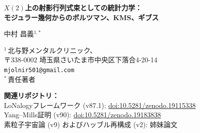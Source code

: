 \documentclass[12pt]{article}
\theoremstyle{plain}
\theoremstyle{definition}
\numberwithin{equation}{section}
\newcommand{\HH}{\mathbb{H}}
\DeclareMathOperator{\Tr}{Tr}
\begin{document}
\begin{titlepage}
\centering
\vspace*{1cm}

{\LARGE\bfseries $X(2)$上の射影行列式束としての統計力学：\\[6pt]
モジュラー幾何からのボルツマン、KMS、ギブス}

\vspace{1.5cm}

{\large 中村 昌義$^{1,*}$}

\vspace{0.8cm}

{\normalsize
$^1$\,北与野メンタルクリニック、\\
〒338-0002 埼玉県さいたま市中央区下落合4-20-14\\
\texttt{mjolnir501@gmail.com}\\[4pt]
$^*$\,責任著者
}

\vspace{0.8cm}

{\small
\noindent\textbf{関連リポジトリ：}\\
LoNalogyフレームワーク (v87.1): \href{https://doi.org/10.5281/zenodo.19115338}{doi:10.5281/zenodo.19115338}\\
Yang--Mills証明 (v90): \href{https://doi.org/10.5281/zenodo.19183838}{doi:10.5281/zenodo.19183838}\\
素粒子宇宙論 (v9) およびハッブル再構成 (v2): 姉妹論文
}

\vspace{1.0cm}

\begin{abstract}
\noindent
任意の有限体積ギブス多体系が、レベル2モジュラー曲線
$X(2)=\Gamma(2)\backslash\HH$上の行列式束の
第1フーリエ・ホロノミーモードとして厳密に表現可能であることを証明する。
具体的には、$e^{-\beta H}$がトレースクラスである
任意の量子系$(\mathcal{H},H)$に対して、
\[
\Tr_{\mathcal{H}}\,e^{-\beta H}
= \int_0^1 e^{-2\pi iu}\,
\det\nolimits_F\!\left(1+e^{2\pi iu}\,e^{-\beta H}\right)du
\]
が成り立つ。右辺は$\beta=2\pi\tau_2$かつ$Q=e^{-2\pi\tau_2}$の
$u$-射影LoNalogy行列式ファイバーである。

本論文は以下の結果を第一原理から証明する：
(i) 木村--テヴナン原理（シューア補行列還元）はガウス型隠れモード消去と
代数的に同一であり、LoNalogyは統計力学の粗視化の核の
温度非依存な一般化である。
(ii) ボルツマン因子$e^{-\beta E}$は公理ではなく、
$X(2)$の$q$-一様化$Q=e^{-2\pi\tau_2}$の座標表示である。
(iii) 松原周波数とボーズ/フェルミ統計は
$X(2)$上の行列式ファイバーのスピン構造（半特性セクター）から生じる。
(iv) KMS条件は戸田--竹崎のモジュラー理論の定理であり、
熱力学の公理ではない。
(v) ギブス変分原理はKMS状態の相対エントロピー系として従う。
(vi) 普遍射影行列式定理により、全ての有限体積ギブス系が
この構造に埋め込まれる。
(vii) 低ランク単一ファイバー圧縮は不可能であることのno-go定理。
(viii) 有限レンジ局所系は転送クラスとして最適な境界ランクを達成する。

普遍性の問題にはopenな部分はない。$X(2)$から平衡統計力学の
全構造への論理鎖は閉じている。
\end{abstract}
\end{titlepage}
\end{document}
